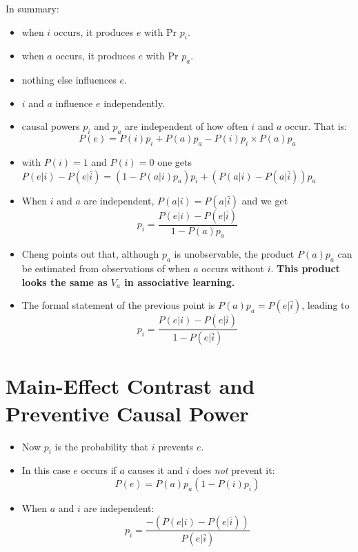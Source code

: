 \documentclass[11pt]{article}
\begin{document}
In summary:
\begin{itemize}
\item when \(i\) occurs, it produces \(e\) with Pr \(p_i\).
\item when \(a\) occurs, it produces \(e\) with Pr \(p_a\).
\item nothing else influences \(e\).
\item \(i\) and \(a\) influence \(e\) independently.
\item causal powers \(p_i\) and \(p_a\) are independent of how often \(i\) and
\(a\) occur. That is:
\begin{displaymath}
  P(e) = P(i)p_i + P(a)p_a - P(i)p_i\times P(a)p_a
\end{displaymath}
\item with \(P(i)=1\) and \(P(i)=0\) one gets \(P(e|i)-P(e|\bar
  i)=(1-P(a|i)p_a)p_i+(P(a|i)-P(a|\bar i))p_a\)
\item When \(i\) and \(a\) are independent, \(P(a|i)=P(a|\bar i)\) and we get
\begin{equation}
  \label{eq:pi}
  p_i = \frac{ P(e|i) - P(e|\bar i) }{ 1 - P(a)p_a }
\end{equation}
\item Cheng points out that, although \(p_a\) is unobservable, the product
\(P(a)p_a\) can be estimated from observations of when \(a\) occurs
without \(i\). \textbf{This product looks the same as \(V_a\) in associative
learning.}
\item The formal statement of the previous point is \(P(a)p_a=P(e|\bar i)\),
leading to
\begin{equation}
  \label{eq:pi}
  p_i = \frac{ P(e|i) - P(e|\bar i) }{ 1 - P(e|\bar i) }
\end{equation}
\end{itemize}

\section{Main-Effect Contrast and Preventive Causal Power}
\label{sec:orgdda9ae0}

\begin{itemize}
\item Now \(p_i\) is the probability that \(i\) prevents \(e\).
\item In this case \(e\) occurs if \(a\) causes it and \(i\) does \emph{not} prevent
it:
\begin{equation}
  \label{eq:pipreventive}
  P(e) = P(a) p_a ( 1 - P(i)p_i )
\end{equation}
\item When \(a\) and \(i\) are independent:
\begin{equation}
  p_i = \frac{ - (P(e|i) - P(e|\bar i)) }{ P(e|\bar i) }
\end{equation}
\end{itemize}
\end{document}

